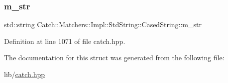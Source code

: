 \subsubsection{\texorpdfstring{m\+\_\+str}{m\_str}}
{\footnotesize\ttfamily std\+::string Catch\+::\+Matchers\+::\+Impl\+::\+Std\+String\+::\+Cased\+String\+::m\+\_\+str}



Definition at line 1071 of file catch.\+hpp.



The documentation for this struct was generated from the following file\+:\begin{DoxyCompactItemize}
\item 
lib/\hyperlink{catch_8hpp}{catch.\+hpp}\end{DoxyCompactItemize}
